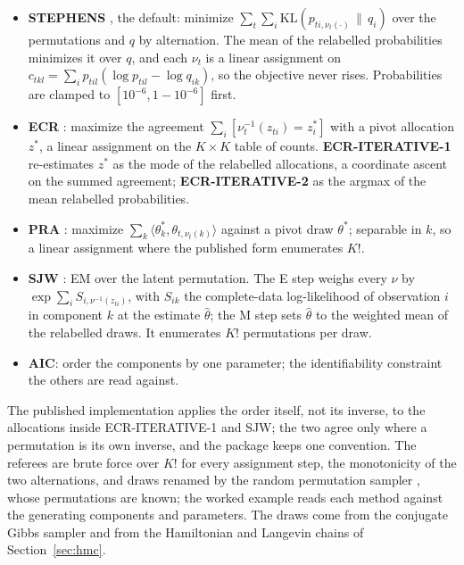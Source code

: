 \documentclass[11pt,a4paper]{article}
\begin{document}
\begin{itemize}
\item \textbf{STEPHENS} \citep{stephens2000}, the default: minimize
  $\sum_t \sum_i \mathrm{KL}(p_{ti,\nu_t(\cdot)} \,\|\, q_i)$ over the
  permutations and $q$ by alternation. The mean of the relabelled
  probabilities minimizes it over $q$, and each $\nu_t$ is a linear assignment
  on $c_{tkl} = \sum_i p_{til}(\log p_{til} - \log q_{ik})$, so the objective
  never rises. Probabilities are clamped to $[10^{-6}, 1 - 10^{-6}]$ first.
\item \textbf{ECR} \citep{papastamoulis2010}: maximize the agreement
  $\sum_i [\nu_t^{-1}(z_{ti}) = z^\ast_i]$ with a pivot allocation $z^\ast$, a
  linear assignment on the $K \times K$ table of counts.
  \textbf{ECR-ITERATIVE-1} re-estimates $z^\ast$ as the mode of the relabelled
  allocations, a coordinate ascent on the summed agreement;
  \textbf{ECR-ITERATIVE-2} as the argmax of the mean relabelled probabilities.
\item \textbf{PRA} \citep{marin2005}: maximize
  $\sum_k \langle \theta^\ast_k, \theta_{t,\nu_t(k)} \rangle$ against a pivot
  draw $\theta^\ast$; separable in $k$, so a linear assignment where the
  published form enumerates $K!$.
\item \textbf{SJW} \citep{sperrin2010}: EM over the latent
  permutation. The E step weighs every $\nu$ by
  $\exp \sum_i S_{i,\nu^{-1}(z_{ti})}$, with $S_{ik}$ the complete-data
  log-likelihood of observation $i$ in component $k$ at the estimate
  $\hat\theta$; the M step sets $\hat\theta$ to the weighted mean of the
  relabelled draws. It enumerates $K!$ permutations per draw.
\item \textbf{AIC}: order the components by one parameter; the identifiability
  constraint the others are read against.
\end{itemize}
The published implementation \citep{papastamoulis2016} applies the order itself, not
its inverse, to the allocations inside ECR-ITERATIVE-1 and SJW; the two agree
only where a permutation is its own inverse, and the package keeps one
convention. The referees are brute force over $K!$ for every assignment step,
the monotonicity of the two alternations, and draws renamed by the random
permutation sampler \citep{fruhwirth2001}, whose permutations are known;
the worked example reads each method against the generating components and
parameters. The draws come from the conjugate Gibbs sampler
\citep{diebolt1994} and from the Hamiltonian and Langevin chains of
Section~\ref{sec:hmc}.
\end{document}
